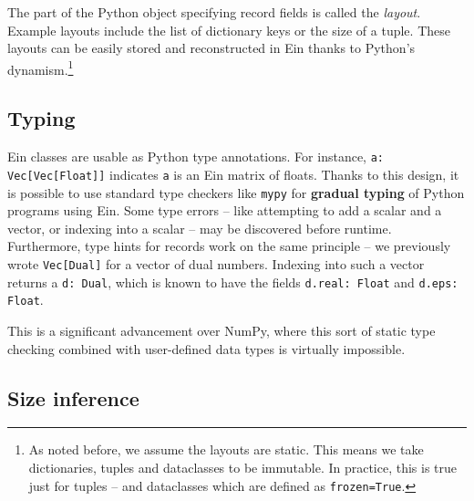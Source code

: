 The part of the Python object specifying record fields is called the \textit{layout}. Example layouts include the list of dictionary keys or the size of a tuple.
These layouts can be easily stored and reconstructed in Ein thanks to Python's dynamism.\footnote{As noted before, we assume the layouts are static. This means we take dictionaries, tuples and dataclasses to be immutable. In practice, this is true just for tuples -- and dataclasses which are defined as \texttt{frozen=True}.}

\subsection{Typing}

Ein classes are usable as Python type annotations. 
For instance, \texttt{a: Vec[Vec[Float]]} indicates \texttt{a} is an Ein matrix of floats. Thanks to this design, it is possible to use standard type checkers like \texttt{mypy} for \textbf{gradual typing} of Python programs using Ein. Some type errors -- like attempting to add a scalar and a vector, or indexing into a scalar -- may be discovered before runtime. Furthermore, type hints for records work on the same principle -- we previously wrote \texttt{Vec[Dual]} for a vector of dual numbers. Indexing into such a vector returns a \texttt{d: Dual}, which is known to have the fields \texttt{d.real: Float} and \texttt{d.eps: Float}.

This is a significant advancement over NumPy, where this sort of static type checking combined with user-defined data types is virtually impossible.



\subsection{Size inference}

